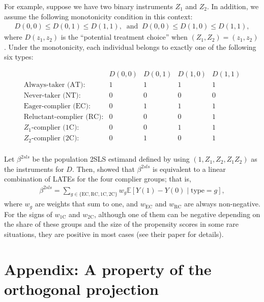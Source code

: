 \documentclass[10.5pt, A4paper, openany, uplatex]{book}
\newcommand{\E}{\mathbb{E}}
\numberwithin{equation}{section}
\begin{document}
For example, suppose we have two binary instruments $Z_1$ and $Z_2$.
In addition, we assume the following monotonicity condition in this context:
\begin{align*}
	D(0, 0) \le D(0, 1) \le D(1,1), \;\; \text{and} \;\; D(0, 0) \le D(1, 0) \le D(1,1),
\end{align*}
where $D(z_1, z_2)$ is the ``potential treatment choice'' when $(Z_1, Z_2) = (z_1, z_2)$.
Under the monotonicity, each individual belongs to exactly one of the following six types:

\[
\begin{array}{l|cccc}
	                                 & D(0, 0) & D(0, 1) & D(1, 0) & D(1, 1) \\\hline
	\text{Always-taker (AT):}        & 1       & 1       & 1       & 1       \\
	\text{Never-taker (NT):}         & 0       & 0       & 0       & 0       \\
	\text{Eager-complier (EC):}      & 0       & 1       & 1       & 1       \\
	\text{Reluctant-complier (RC):}  & 0       & 0       & 0       & 1       \\	 
	\text{$Z_1$-complier (1C):}      & 0       & 0       & 1       & 1       \\	
	\text{$Z_2$-complier (2C):}      & 0       & 1       & 0       & 1       \\	 
\end{array}
\]

Let $\beta^{2sls}$ be the population 2SLS estimand defined by using $(1, Z_1, Z_2, Z_1 Z_2)$ as the instruments for $D$.
Then, \cite{mogstad2021causal} showed that $\beta^{2sls}$ is equivalent to a linear combination of LATEs for the four complier groups; that is,
\begin{align*}
	\beta^{2sls} = \sum_{g \in \{\text{EC}, \text{RC}, \text{1C}, \text{2C}\}} w_g \E[Y(1) - Y(0) \mid \text{type} = g],
\end{align*}
where $w_g$ are weights that sum to one, and $w_{\text{EC}}$ and $w_{\text{RC}}$ are always non-negative.
For the signs of $w_{\text{1C}}$ and $w_{\text{2C}}$, although one of them can be negative depending on the share of these groups and the size of the propensity scores in some rare situations, they are positive in most cases (see their paper for details).

\section*{Appendix: A property of the orthogonal projection}
	
\end{document}
